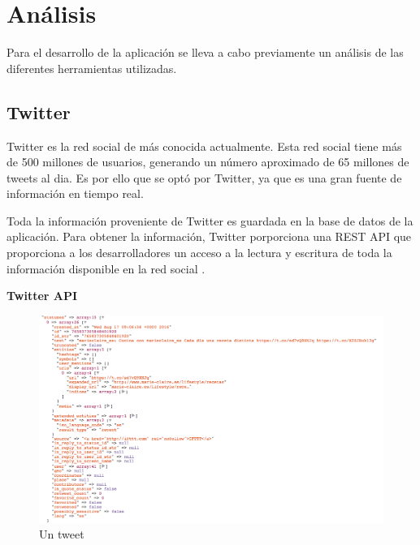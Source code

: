 \section{Análisis}

Para el desarrollo de la aplicación se lleva a cabo previamente un análisis de las diferentes herramientas utilizadas.

\subsection{Twitter}

Twitter es la red social de  más conocida actualmente. Esta red social tiene más de 500 millones de usuarios, generando un número aproximado de 65 millones de tweets al dia.
Es por ello que se optó por Twitter, ya que es una gran fuente de información en tiempo real.

\vspace{5 mm}

Toda la información proveniente de Twitter es guardada en la base de datos de la aplicación. Para obtener la información,
Twitter porporciona una REST API que proporciona a los desarrolladores un acceso a la lectura y escritura de toda la información disponible
en la red social \cite{twitter-api}.

\vspace{5 mm}

\textbf{Twitter API}

\vspace{5 mm}

\begin{figure}
\begin{center}
\includegraphics[width=1.0\textwidth]{imagenes/estructura-tweet.png}
\caption{Un tweet}
\label{tweet}
\end{center}
\end{figure}

